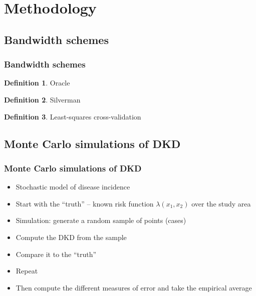\documentclass[notheorems]{beamer}
\theoremstyle{definition}
\newtheorem{definition}{Definition}
\theoremstyle{example}
\begin{document}
\section{Methodology}

\subsection{Bandwidth schemes}
\begin{frame}\frametitle{Bandwidth schemes}

    \begin{definition}
        Oracle
    \end{definition}
    \begin{definition}
        Silverman
    \end{definition}
    \begin{definition}
        Least-squares cross-validation
    \end{definition}
\end{frame}

\subsection{Monte Carlo simulations of DKD}
\begin{frame}\frametitle{Monte Carlo simulations of DKD}
    \begin{itemize}
        \item Stochastic model of disease incidence
        \item Start with the ``truth'' -- known risk function $\lambda(x_1, x_2)$ over the study area
        \item Simulation: generate a random sample of points (cases)
        \item Compute the DKD from the sample
        \item Compare it to the ``truth''
        \item Repeat \textellipsis
        \item Then compute the different measures of error and take the empirical average
    \end{itemize}
\end{frame}

\end{document}

